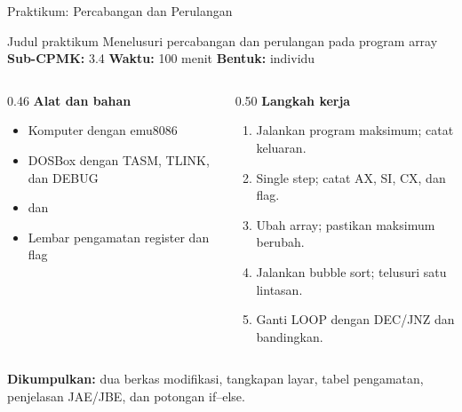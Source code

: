 \documentclass[aspectratio=169,11pt]{beamer}
\begin{document}
\begin{frame}{Praktikum: Percabangan dan Perulangan}
\begin{block}{Judul praktikum}
\small Menelusuri percabangan dan perulangan pada program array\\[0.15em]
\textbf{Sub-CPMK:} 3.4 \quad\textbullet\quad
\textbf{Waktu:} 100 menit \quad\textbullet\quad
\textbf{Bentuk:} individu
\end{block}

\vspace{0.2em}
\begin{columns}[t]
\begin{column}{0.46\textwidth}
{\color{obeBlue}\bfseries Alat dan bahan}
\begin{itemize}\footnotesize
    \item Komputer dengan emu8086
    \item DOSBox dengan TASM, TLINK, dan DEBUG
    \item {} dan 
    \item Lembar pengamatan register dan flag
\end{itemize}
\end{column}
\begin{column}{0.50\textwidth}
{\color{obeBlue}\bfseries Langkah kerja}
\begin{enumerate}\footnotesize
    \item Jalankan program maksimum; catat keluaran.
    \item Single step; catat AX, SI, CX, dan flag.
    \item Ubah array; pastikan maksimum berubah.
    \item Jalankan bubble sort; telusuri satu lintasan.
    \item Ganti LOOP dengan DEC/JNZ dan bandingkan.
\end{enumerate}
\end{column}
\end{columns}

\vspace{0.2em}
{\footnotesize\textbf{Dikumpulkan:} dua berkas 
modifikasi, tangkapan layar, tabel pengamatan, penjelasan JAE/JBE,
dan potongan if--else.\par}
\end{frame}
\end{document}
